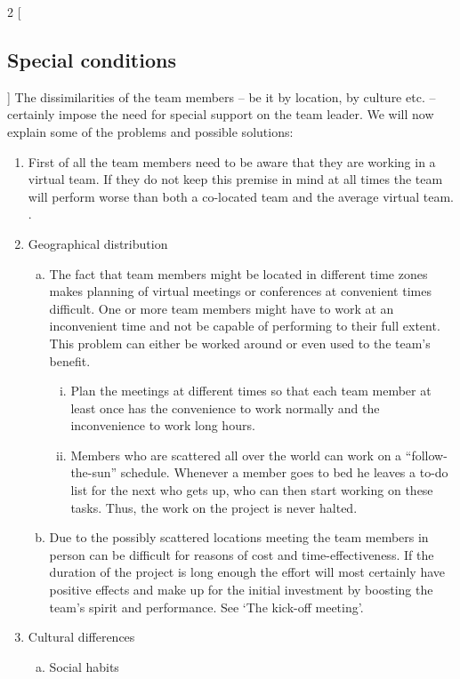 \begin{multicols}{2}
[\subsection{Special conditions }]
The dissimilarities of the team members – be it by location, by culture etc. – certainly impose the need for special support on the team leader. We will now explain some of the problems and possible solutions:
\begin{enumerate}[1.]
\item First of all the team members need to be aware that they are working in a virtual team. If they do not keep this premise in mind at all times the team will perform worse than both a co-located team and the average virtual team.  \cite{outperform}.
\item Geographical distribution
		\begin{enumerate}[a)]
		  \item The fact that team members might be located in different time zones makes planning of virtual meetings or conferences at convenient times difficult. One or more team members might have to work at an inconvenient time and not be capable of performing to their full extent. This problem can either be worked around or even used to the team’s benefit.
			\begin{enumerate}[i.]
			  	\item Plan the meetings at different times so that each team member at least once has the convenience to work normally and the inconvenience to work long hours.
				\item Members who are scattered all over the world can work on a “follow-the-sun” schedule. Whenever a member goes to bed he leaves a to-do list for the next who gets up, who can then start working on these tasks. Thus, the work on the project is never halted.
			\end{enumerate}
		  \item Due to the possibly scattered locations meeting the team members in person can be difficult for reasons of cost and time-effectiveness. If the duration of the project is long enough the effort will most certainly have positive effects and make up for the initial investment by boosting the team’s spirit and performance. See ‘The kick-off meeting’.
		\end{enumerate}
\item Cultural differences
		\begin{enumerate}[a)]
			  \item Social habits \\ 

\end{enumerate}
\end{enumerate}
\end{multicols}

